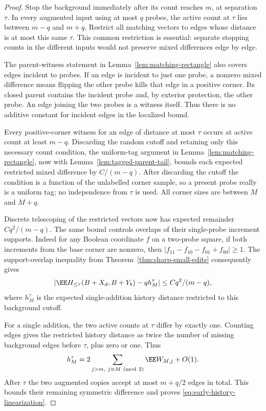 \documentclass[11pt,letterpaper]{article}
\begin{document}
\begin{proof}
Stop the background immediately after its count reaches $m$, at
separation $\tau$. In every augmented input using at most $q$ probes,
the active count at $\tau$ lies between $m-q$ and $m+q$.
Restrict all matching vectors to edges whose distance is at most
this same $\tau$. This common restriction is essential: separate
stopping counts in the different inputs would not preserve mixed
differences edge by edge.

The parent-witness statement in Lemma~\ref{lem:matching-rectangle}
also covers edges incident to probes. If an edge is incident to
just one probe, a nonzero mixed difference means flipping the other
probe kills that edge in a positive corner. Its closed parent
contains the incident probe and, by exterior protection, the other
probe. An edge joining the two probes is a witness itself.
Thus there is no additive constant for incident edges in the
localized bound.

Every positive-corner witness for an edge of distance at most $\tau$
occurs at active count at least $m-q$. Discarding the random cutoff
and retaining only this necessary count condition, the uniform-tag
argument in Lemma~\ref{lem:matching-rectangle}, now with
Lemma~\ref{lem:tagged-parent-tail}, bounds each expected restricted
mixed difference by $C/(m-q)$. After discarding the cutoff the
condition is a function of the unlabelled corner sample, so a present
probe really is a uniform tag; no independence from $\tau$ is used.
All corner sizes are between $M$ and $M+q$.

Discrete telescoping of the restricted vectors now has expected
remainder $Cq^2/(m-q)$. The same bound controls overlaps of their
single-probe increment supports. Indeed for any Boolean coordinate
$f$ on a two-probe square, if both increments from the base corner
are nonzero, then
$|f_{11}-f_{10}-f_{01}+f_{00}|\ge1$.
The support-overlap inequality from
Theorem~\ref{thm:sharp-small-edits} consequently gives
\[
 \left|\EE H_{\le\tau}(B+X_d,B+Y_b)-q h_M^\tau\right|
          \le Cq^2/(m-q),
\]
where $h_M^\tau$ is the expected single-addition history distance
restricted to this background cutoff.

For a single addition, the two active counts at $\tau$ differ by
exactly one. Counting edges gives the restricted history distance as
twice the number of missing background edges before $\tau$, plus
zero or one. Thus
\[
 h_M^\tau=2\sum_{j>m,\ j\equiv M\ ({\rm mod}\ 2)}\EE W_{M,j}+O(1).
\]
After $\tau$ the two augmented copies accept at most $m+q/2$ edges
in total. This bounds their remaining symmetric difference and
proves \eqref{eq:early-history-linearization}.
\end{proof}
\end{document}
